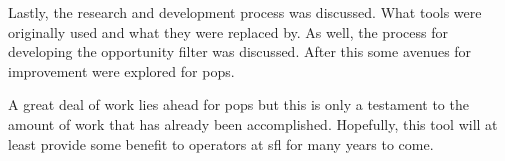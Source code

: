 Lastly, the research and development process was discussed. What tools were
originally used and what they were replaced by. As well, the process for
developing the opportunity filter was discussed. After this some avenues for
improvement were explored for \gls{pops}. 

A great deal of work lies ahead for \gls{pops} but this is only a testament to
the amount of work that has already been accomplished. Hopefully, this tool
will at least provide some benefit to operators at \gls{sfl} for many years to
come.










